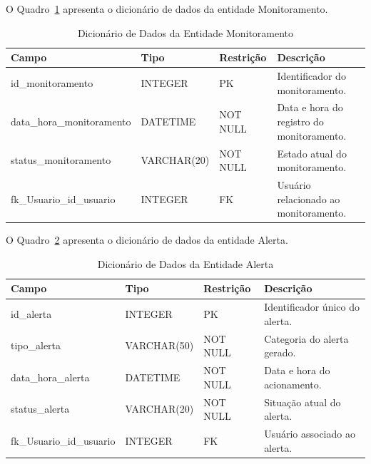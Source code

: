 O Quadro~\ref{quad_monitoramento} apresenta o dicionário de dados da entidade Monitoramento.

\begin{table}[H]
\caption{Dicionário de Dados da Entidade Monitoramento}
\label{quad_monitoramento}
\centering
\footnotesize

\begin{tabular}{|p{4.0cm}|p{2.5cm}|p{2.5cm}|p{5.5cm}|}
\hline
\textbf{Campo} & \textbf{Tipo} & \textbf{Restrição} & \textbf{Descrição} \\
\hline

id\_monitoramento & INTEGER & PK & Identificador do monitoramento. \\
\hline

data\_hora\_monitoramento & DATETIME & NOT NULL & Data e hora do registro do monitoramento. \\
\hline

status\_monitoramento & VARCHAR(20) & NOT NULL & Estado atual do monitoramento. \\
\hline

fk\_Usuario\_id\_usuario & INTEGER & FK & Usuário relacionado ao monitoramento. \\
\hline

\end{tabular}

\normalsize

\end{table}

O Quadro~\ref{quad_alerta} apresenta o dicionário de dados da entidade Alerta.

\begin{table}[H]
\caption{Dicionário de Dados da Entidade Alerta}
\label{quad_alerta}
\centering
\footnotesize

\begin{tabular}{|p{4.0cm}|p{2.5cm}|p{2.5cm}|p{5.5cm}|}
\hline
\textbf{Campo} & \textbf{Tipo} & \textbf{Restrição} & \textbf{Descrição} \\
\hline

id\_alerta & INTEGER & PK & Identificador único do alerta. \\
\hline

tipo\_alerta & VARCHAR(50) & NOT NULL & Categoria do alerta gerado. \\
\hline

data\_hora\_alerta & DATETIME & NOT NULL & Data e hora do acionamento. \\
\hline

status\_alerta & VARCHAR(20) & NOT NULL & Situação atual do alerta. \\
\hline

fk\_Usuario\_id\_usuario & INTEGER & FK & Usuário associado ao alerta. \\
\hline

\end{tabular}

\normalsize

\end{table}

